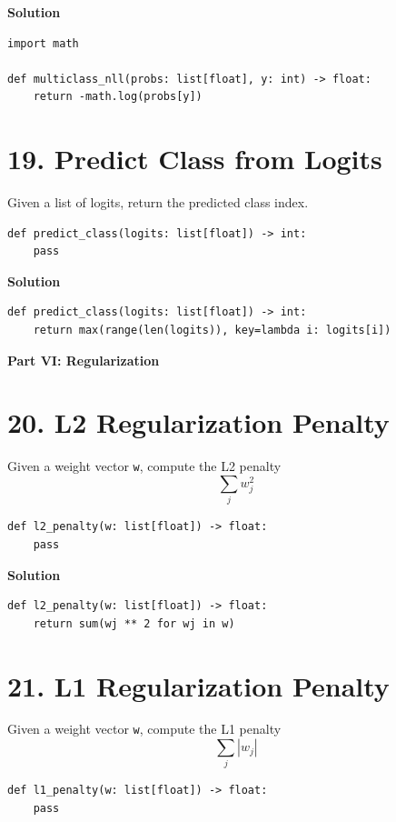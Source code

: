 \documentclass[11pt]{article}
\begin{document}
\medskip
\noindent\textbf{Solution}
\begin{lstlisting}
import math

def multiclass_nll(probs: list[float], y: int) -> float:
    return -math.log(probs[y])
\end{lstlisting}

\section*{19. Predict Class from Logits}
Given a list of logits, return the predicted class index.

\begin{lstlisting}
def predict_class(logits: list[float]) -> int:
    pass
\end{lstlisting}

\medskip
\noindent\textbf{Solution}
\begin{lstlisting}
def predict_class(logits: list[float]) -> int:
    return max(range(len(logits)), key=lambda i: logits[i])
\end{lstlisting}

\vspace{0.75em}
\noindent\textbf{\large Part VI: Regularization}
\vspace{0.5em}

\section*{20. L2 Regularization Penalty}
Given a weight vector \texttt{w}, compute the L2 penalty
\[
\sum_j w_j^2
\]

\begin{lstlisting}
def l2_penalty(w: list[float]) -> float:
    pass
\end{lstlisting}

\medskip
\noindent\textbf{Solution}
\begin{lstlisting}
def l2_penalty(w: list[float]) -> float:
    return sum(wj ** 2 for wj in w)
\end{lstlisting}

\section*{21. L1 Regularization Penalty}
Given a weight vector \texttt{w}, compute the L1 penalty
\[
\sum_j |w_j|
\]

\begin{lstlisting}
def l1_penalty(w: list[float]) -> float:
    pass
\end{lstlisting}
\end{document}
